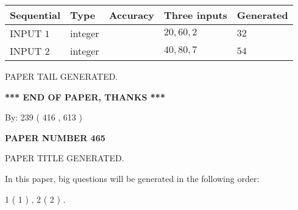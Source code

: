 \documentclass{ctexart}
\begin{document}
   
  
  
\noindent\begin{tabular}{|l|l|l|l|l|}
\hline
 Sequential & Type & Accuracy & Three inputs & Generated \\ 
\hline
 
 
  INPUT $  1 $ & integer &  & $
 20
 , 
 60
 , 
 2
 $ & $ 32 $ 
 \\  \hline  
 
 
  INPUT $  2 $ & integer &  & $
 40
 , 
 80
 , 
 7
 $ & $ 54 $ 
 \\  \hline  
 \end{tabular}
   
   
   
   
   
   
 \vspace{0.2in}
 
   
   
\vspace{2.0in} PAPER TAIL GENERATED.
   
   
   
   
\vspace{1.0in} 
{\textbf{\large{ *** END OF PAPER, THANKS *** }}} 
   
   
\hspace{1.0in} By: 
 239 ( 416 ,  613 )
   
   
   
   
\newpage 
\setcounter{page}{ 
   465001 } 
   
   
   
   
 {\textbf{ \Large{ PAPER NUMBER  465  }}}
   
   
\vspace{0.2in}
   
   
   
   
   
   
   
   
 \vspace{0.2in}
 
 
 
 
   
   
 PAPER TITLE GENERATED.
   
   
   
\vspace{0.2in}
   
In this paper, big questions will be generated in the following order: 
   
   
   1 ( 1 )
 ,
   2 ( 2 )
 .
  
\end{document}
